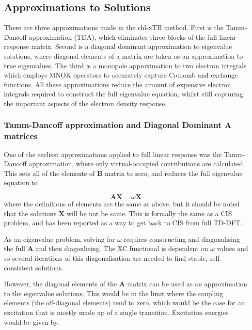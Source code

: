 \subsection{Approximations to Solutions}
\label{subsec:chl_approxs}

There are three approximations made in the chl-xTB method. First is the Tamm-Dancoff 
approximation (TDA), which eliminates three blocks of the full linear response matrix.
Second is a diagonal dominant approximation to eigenvalue solutions, where diagonal 
elements of a matrix are taken as an approximation to true eigenvalues. The third
is a monopole approximation to two electron integrals which employs MNOK operators 
to accurately capture Coulomb and exchange functions. All these approximations 
reduce the amount of expensive electron integrals required to construct the full
eigenvalue equation, whilst still capturing the important aspects of the electron 
density response.

\subsubsection{Tamm-Dancoff approximation and Diagonal Dominant $\mathbf{A}$ matrices}
\label{subsubsec:Tamm_Dancoff}

One of the earliest approximations applied to full linear response was the Tamm-Dancoff
approximation, where only virtual-occupied contributions are calculated. This sets
all of the elements of $\mathbf{B}$ matrix to zero, and reduces the full eigenvalue 
equation to 

\begin{equation}
\mathbf{A} \mathbf{X} = \omega \mathbf{X}
\end{equation}
%
where the definitions of elements are the same as above, but it should be noted 
that the solutions $\mathbf{X}$ will be not be same. This is formally the same as
a CIS problem, and has been reported as a way to get back to CIS from full
TD-DFT.

As an eigenvalue problem, solving for $\omega$ requires constructing and diagonalising
the full $\mathbf{A}$ and then diagonlising. The XC functional is dependent on 
$\omega$ values and so several iterations of this diagonalisation are needed to
find stable, self-consistent solutions.

However, the diagonal elements of the $\mathbf{A}$ matrix can be used as an approximation
to the eigenvalue solutions. This would be in the limit where the coupling elements
(the off-diagonal elements) tend to zero, which would be the case for an excitation
that is mostly made up of a single transition. Excitation energies would be given
by:

